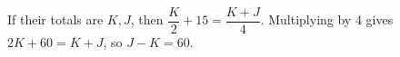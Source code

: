 If their totals are $ K,J $, then $\dfrac{K}{2}+15=\dfrac{K+J}{4}$. Multiplying by 4 gives $ 2K+60=K+J $, so $\boxed{J-K=60}$.
